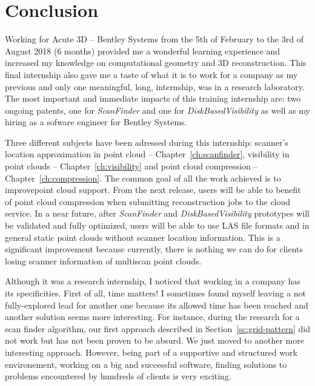 \chapter{Conclusion}
\label{ch:conclusion}

Working for Acute 3D -- Bentley Systems from the 5th of February to the 3rd of August 2018 (6 months) provided me a wonderful learning experience and increased my knowledge on computational geometry and 3D reconstruction. This final internship also gave me a taste of what it is to work for a company as my previous and only one meaningful, long, internship, was in a research laboratory. The most important and immediate impacts of this training internship are: two ongoing patents, one for
\emph{ScanFinder} and one for \emph{DiskBasedVisibility} as well as my hiring as a sofware engineer for Bentley Systems.

Three different subjects have been adressed during this internship: scanner's location approximation in point cloud -- Chapter~\ref{ch:scanfinder}, visibility in point clouds -- Chapter~\ref{ch:visibility} and point cloud compression -- Chapter~\ref{ch:compression}. The common goal of all the work achieved is to improve\CC point cloud support. From the next \CC release, users will be able to benefit of point cloud compression when submitting reconstruction jobs to the cloud service. In a near future, after \emph{ScanFinder} and \emph{DiskBasedVisibility} prototypes will be validated and fully optimized, users will be able to use LAS file formats and in general static point clouds without scanner location information. This is a significant improvement because currently, there is nothing we can do for clients losing scanner information of multiscan point clouds.

Although it was a research internship, I noticed that working in a company has its specificities. First of all, time matters! I sometimes found myself leaving a not fully-explored lead for another one because its allowed time has been reached and another solution seems more interesting. For instance, during the research for a scan finder algorithm, our first approach described in Section~\ref{sc:grid-pattern} did not work but has not been proven to be absurd. We just moved to another more
interesting approach. However, being part of a supportive and structured work environement, working on a big and successful software, finding solutions to problems encountered by hundreds of clients is very exciting.

